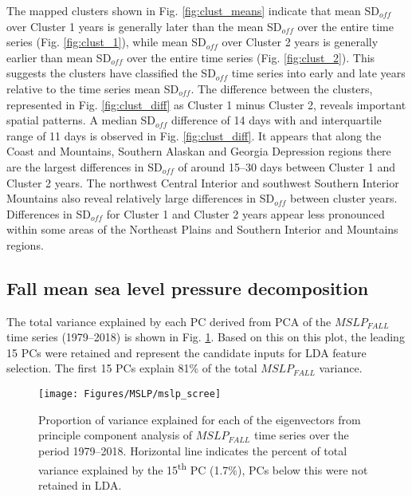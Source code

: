 \documentclass{tATO2e}
\newcommand{\sdoff}{SD$_{off}$}
\begin{document}
The mapped clusters shown in Fig. \ref{fig:clust_means}  indicate that mean \sdoff{} over Cluster 1 years is generally later than the mean \sdoff{} over the entire time series (Fig. \ref{fig:clust_1}), while mean \sdoff{} over Cluster 2 years is generally earlier than mean \sdoff{} over the entire time series (Fig. \ref{fig:clust_2}). This suggests the clusters have classified the \sdoff{} time series into early and late years relative to the time series mean \sdoff{}. The difference between the clusters, represented in Fig. \ref{fig:clust_diff} as Cluster 1 minus Cluster 2, reveals important spatial patterns. A median \sdoff{} difference of 14 days with and interquartile range of 11 days is observed in Fig. \ref{fig:clust_diff}. It appears that along the Coast and Mountains, Southern Alaskan and Georgia Depression regions there are the largest differences in \sdoff{} of around 15--30 days between Cluster 1 and Cluster 2 years. The northwest Central Interior and southwest Southern Interior Mountains also reveal relatively large differences in \sdoff{} between cluster years. Differences in \sdoff{} for Cluster 1 and Cluster 2 years appear less pronounced within some areas of the Northeast Plains and Southern Interior and Mountains regions.  

\subsection{Fall mean sea level pressure decomposition}\label{sec:mslp_decomp}
The total variance explained by each PC derived from PCA of the $MSLP_{FALL}$ time series (1979--2018) is shown in Fig. \ref{fig:mslpscree}. Based on this on this plot, the leading 15 PCs were retained and represent the candidate inputs for LDA feature selection. The first 15 PCs explain 81\% of the total $MSLP_{FALL}$ variance. 

\begin{figure}
	\begin{center}
		\texttt{[image: Figures/MSLP/mslp\_scree]}
		\caption{Proportion of variance explained for each of the eigenvectors from principle component analysis of $MSLP_{FALL}$ time series over the period 1979--2018. Horizontal line indicates the percent of total variance explained by the 15\textsuperscript{th} PC (1.7\%), PCs below this were not retained in LDA.}
		\label{fig:mslpscree}
	\end{center}
\end{figure}
\end{document}
